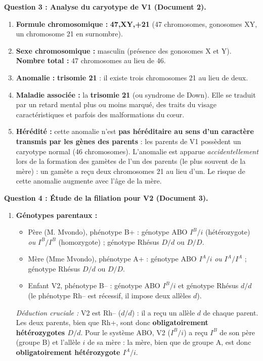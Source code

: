 \documentclass[11pt]{article}
\begin{document}
\begin{exoresolu}
\textbf{Question 3 : Analyse du caryotype de V1 (Document 2).}
\begin{enumerate}
    \item \textbf{Formule chromosomique :} \textbf{47,XY,+21} (47 chromosomes, gonosomes XY, un chromosome 21 en surnombre).
    \item \textbf{Sexe chromosomique :} masculin (présence des gonosomes X et Y). \textbf{Nombre total :} 47 chromosomes au lieu de 46.
    \item \textbf{Anomalie :} \textbf{trisomie 21} : il existe trois chromosomes 21 au lieu de deux.
    \item \textbf{Maladie associée :} la \textbf{trisomie 21} (ou syndrome de Down). Elle se traduit par un retard mental plus ou moins marqué, des traits du visage caractéristiques et parfois des malformations du c\oe ur.
    \item \textbf{Hérédité :} cette anomalie n'est \textbf{pas héréditaire au sens d'un caractère transmis par les gènes des parents} : les parents de V1 possèdent un caryotype normal (46 chromosomes). L'anomalie est apparue \emph{accidentellement} lors de la formation des gamètes de l'un des parents (le plus souvent de la mère) : un gamète a reçu deux chromosomes 21 au lieu d'un. Le risque de cette anomalie augmente avec l'âge de la mère.
\end{enumerate}

\textbf{Question 4 : Étude de la filiation pour V2 (Document 3).}
\begin{enumerate}
    \item \textbf{Génotypes parentaux :}
    \begin{itemize}
        \item Père (M. Mvondo), phénotype B+ : génotype ABO $I^B/i$ (hétérozygote) \emph{ou} $I^B/I^B$ (homozygote) ; génotype Rhésus $D/d$ ou $D/D$.
        \item Mère (Mme Mvondo), phénotype A+ : génotype ABO $I^A/i$ \emph{ou} $I^A/I^A$ ; génotype Rhésus $D/d$ ou $D/D$.
        \item Enfant V2, phénotype B– : génotype ABO \textbf{$I^B/i$} et génotype Rhésus \textbf{$d/d$} (le phénotype Rh– est récessif, il impose deux allèles $d$).
    \end{itemize}
    \emph{Déduction cruciale :} V2 est Rh– ($d/d$) : il a reçu un allèle $d$ de chaque parent. Les deux parents, bien que Rh+, sont donc \textbf{obligatoirement hétérozygotes $D/d$}. Pour le système ABO, V2 ($I^B/i$) a reçu $I^B$ de son père (groupe B) et l'allèle $i$ de sa mère : la mère, bien que de groupe A, est donc \textbf{obligatoirement hétérozygote $I^A/i$}.


\end{enumerate}
\end{exoresolu}
\end{document}
